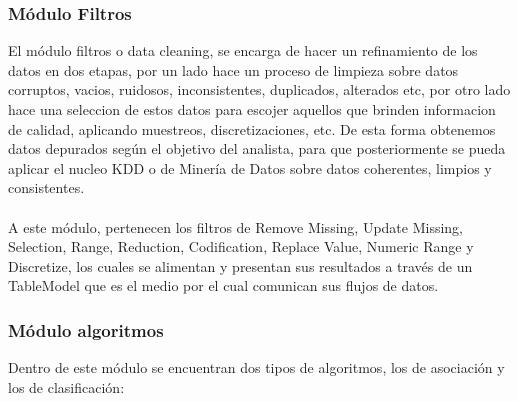 \subsubsection{M\'odulo Filtros}
El m\'odulo filtros o data cleaning, se encarga de hacer un refinamiento de los datos en  dos etapas, por un lado
hace un proceso de limpieza sobre datos corruptos, vacios, ruidosos, inconsistentes, duplicados, alterados etc,
por otro lado hace una seleccion de estos datos para escojer aquellos que brinden informacion de calidad,
aplicando muestreos, discretizaciones, etc. De esta forma obtenemos datos depurados seg\'un el objetivo del
analista, para que posteriormente se pueda aplicar el nucleo KDD o de Miner\'ia de Datos sobre datos coherentes,
limpios y consistentes.\\
\\
A este m\'odulo, pertenecen los filtros de Remove Missing, Update Missing, Selection, Range, Reduction,
Codification, Replace Value, Numeric Range y Discretize, los cuales se alimentan y presentan sus resultados a
trav\'es de un TableModel que es el medio por el cual comunican sus flujos de datos.

\subsubsection{M\'odulo algoritmos}
Dentro de este m\'odulo se encuentran dos tipos de algoritmos, los de asociaci\'on y los de clasificaci\'on:

